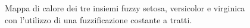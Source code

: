 \documentclass [11pt,a4paper,twoside,openright] {book}
\begin{document}
\begin{figure}[H]
        \centering%
        \qquad\qquad
       \qquad\qquad
          \caption{Mappa di calore dei tre insiemi fuzzy setosa, versicolor e virginica con l'utilizzo di una fuzzificazione costante a tratti.\label{qc}}
\end{figure}
\end{document}
